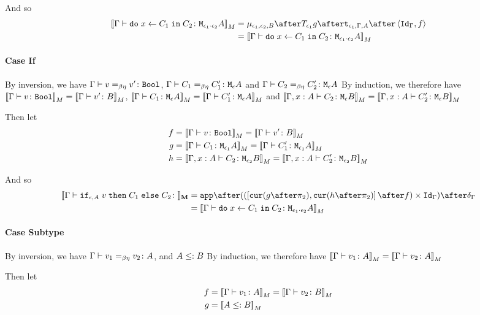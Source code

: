 {    And so
    \begin{equation}
        \begin{split}
            \deno{\gtyperelation{\doin{x}{C_1}{C_2}}{\M{\e_1\dot\e_2}{A}}} & = \bind{\e_1}{\e_2}{B} \after \T{\e_1}{g} \after \tstrength{\e_1}{\G}{A} \after \pr{\idg}{f}\\
             & = \deno{\gtyperelation{\doin{x}{C_1}{C_2}}{\M{\e_1\dot\e_2}{A}}}
        \end{split}
    \end{equation}
    \paragraph{Case If}
    By inversion, we have $\Gamma \vdash v =_{\beta\eta} v' \colon \texttt{Bool}$, $\Gamma \vdash C_1 =_{\beta\eta} C_1' \colon \texttt{M}_{\epsilon}{A}$ and $\Gamma \vdash C_2 =_{\beta\eta} C_2' \colon \texttt{M}_{\epsilon}{A}$
    By induction, we therefore have ${\bf [\![}\Gamma \vdash v \colon \texttt{Bool}{\bf ]\!]}_M = {\bf [\![}\Gamma \vdash v' \colon B{\bf ]\!]}_M$, ${\bf [\![}\Gamma \vdash C_1 \colon \texttt{M}_{\epsilon}{A}{\bf ]\!]}_M= {\bf [\![}\Gamma \vdash C_1' \colon \texttt{M}_{\epsilon}{A}{\bf ]\!]}_M$ and ${\bf [\![}\Gamma, x: A \vdash C_2 \colon \texttt{M}_{\epsilon}{B}{\bf ]\!]}_M = {\bf [\![}\Gamma, x: A \vdash C_2' \colon \texttt{M}_{\epsilon}{B}{\bf ]\!]}_M$

    Then let
    \begin{align}
        f &{}=\deno{\gtyperelation{v}{\B}} = \deno{\gtyperelation{v'}{B}}\\
        g &{}=\deno{\gtyperelation{C_1}{\M{\e_1}{A}}}= \deno{\gtyperelation{C_1'}{\M{\e_1}{A}}}\\
        h &{}=\deno{\typerelation{\gax}{C_2}{\M{\e_2}{B}}} = \deno{\typerelation{\gax}{C_2'}{\M{\e_2}{B}}}
    \end{align}



    And so
    \begin{equation}
        \begin{split}
            \deno{\gtyperelation{\ifthenelse{\e}{A}{v}{C_1}{C_2}}} & = \ifMorph{f}{g}{h}\\
             & = \deno{\gtyperelation{\doin{x}{C_1}{C_2}}{\M{\e_1\dot\e_2}{A}}}
        \end{split}
    \end{equation}
    \paragraph{Case Subtype}
    By inversion, we have $\Gamma \vdash v_1 =_{\beta\eta} v_2 \colon A$, and $A \leq: B$ 
    By induction, we therefore have ${\bf [\![}\Gamma \vdash v_1 \colon A{\bf ]\!]}_M = {\bf [\![}\Gamma \vdash v_2 \colon A{\bf ]\!]}_M$

    Then let
    \begin{align}
        f &{}={\bf [\![}\Gamma \vdash v_1 \colon A{\bf ]\!]}_M = {\bf [\![}\Gamma \vdash v_2 \colon B{\bf ]\!]}_M\\
        g &{}={\bf [\![}A \leq: B{\bf ]\!]}_M
    \end{align}



}

